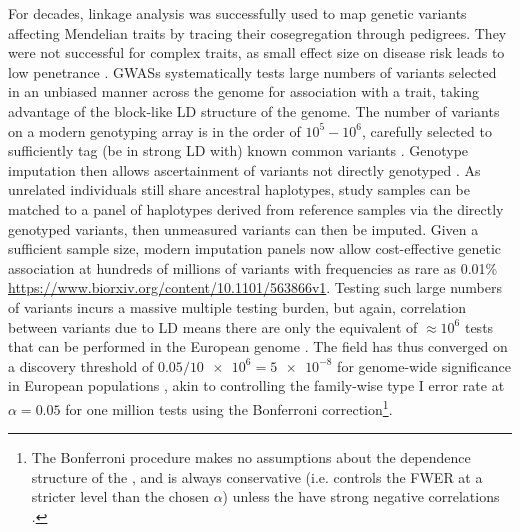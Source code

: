 \begin{outline}
For decades, linkage analysis was successfully used to map genetic variants affecting Mendelian traits by tracing their cosegregation through pedigrees.
They were not successful for complex traits, as small effect size on disease risk leads to low penetrance \autocite{visscher2012FiveYearsGWAS}.
\glspl{GWAS} systematically tests large numbers of variants selected in an unbiased manner across the genome for association with a trait, taking advantage of the block-like \gls{LD} structure of the genome.
    \2 The number of variants on a modern genotyping array is in the order of $10^5 - 10^6$, carefully selected to sufficiently tag (be in strong \gls{LD} with) known common variants \autocite{theinternationalhapmapconsortium2005HaplotypeMapHuman}.
    \2 Genotype imputation then allows ascertainment of variants not directly genotyped \autocite{das2018GenotypeImputationLarge}.
    As unrelated individuals still share ancestral haplotypes, study samples can be matched to a panel of haplotypes derived from reference samples via the directly genotyped variants, then unmeasured variants can then be imputed.
    Given a sufficient sample size, modern imputation panels now allow cost-effective genetic association at hundreds of millions of variants with frequencies as rare as 0.01\% \url{https://www.biorxiv.org/content/10.1101/563866v1}. 
    \2 Testing such large numbers of variants incurs a massive multiple testing burden, but again, correlation between variants due to \gls{LD} means there are only the equivalent of $\approx 10^6$ tests that can be performed in the European genome \autocite{peer2008EstimationMultipleTesting}.
    \2 The field has thus converged on a discovery threshold of $0.05 / \num{10e6} = \num{5e-8}$ for genome-wide significance in European populations \autocite{jannot2015108HasEmerged},
    akin to controlling the family-wise type I error rate at $\alpha = 0.05$ for one million tests using the Bonferroni correction\footnote{
        The Bonferroni procedure makes no assumptions about the dependence structure of the \pvalues, and is always conservative (i.e. controls the \gls{FWER} at a stricter level than the chosen $\alpha$) unless the \pvalues have strong negative correlations \autocite{goeman2014MultipleHypothesisTesting}.
    }.


\end{outline}
